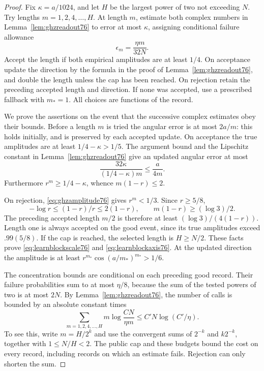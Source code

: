 \begin{proof}
Fix $\kappa=a/1024$, and let $H$ be the largest power of two not
exceeding $N$.  Try lengths $m=1,2,4,\ldots,H$.  At length $m$,
estimate both complex numbers in Lemma~\ref{lem:ghzreadout76} to
error at most $\kappa$, assigning conditional failure allowance
\begin{equation}\label{eq:learnstagebudget76}
 \epsilon_m=\frac{\eta m}{32N}.
\end{equation}
Accept the length if both empirical amplitudes are at least $1/4$.
On acceptance update the direction by the formula in the proof of
Lemma~\ref{lem:ghzreadout76}, and double the length unless the cap
has been reached.  On rejection retain the preceding accepted
length and direction.  If none was accepted, use a prescribed
fallback with $m_*=1$.  All choices are functions of the record.

We prove the assertions on the event that the successive complex
estimates obey their bounds.  Before a length $m$ is tried the
angular error is at most $2a/m$: this holds initially, and is
preserved by each accepted update.  On acceptance the true
amplitudes are at least $1/4-\kappa>1/5$.  The argument bound and
the Lipschitz constant in Lemma~\ref{lem:ghzreadout76} give an
updated angular error at most
\[
 \frac{32\kappa}{(1/4-\kappa)m}\le\frac{a}{4m}.
\]
Furthermore $r^m\ge1/4-\kappa$, whence $m(1-r)\le2$.

On rejection, \eqref{eq:ghzamplitude76} gives $r^m<1/3$.
Since $r\ge5/8$,
\[
 -\log r\le(1-r)/r\le2(1-r),
 \qquad m(1-r)\ge(\log3)/2.
\]
The preceding accepted length $m/2$ is therefore at least
$(\log3)/(4(1-r))$.  Length one is always accepted on the good
event, since its true amplitudes exceed $.99(5/8)$.  If the cap is
reached, the selected length is $H\ge N/2$.  These facts prove
\eqref{eq:learnblockscale76} and \eqref{eq:learnblockaxis76}.
At the updated direction the amplitude is at least
$r^{m_*}\cos(a/m_*)^{m_*}>1/6$.

The concentration bounds are conditional on each preceding good
record.  Their failure probabilities sum to at most $\eta/8$,
because the sum of the tested powers of two is at most $2N$.
By Lemma~\ref{lem:ghzreadout76}, the number of calls is bounded by
an absolute constant times
\begin{equation}\label{eq:learndyadiccost76}
 \sum_{m=1,2,4,\ldots,H}
       m\log\frac{CN}{\eta m}
       \le C'N\log(C'/\eta).
\end{equation}
To see this, write $m=H/2^k$ and use the convergent sums of
$2^{-k}$ and $k2^{-k}$, together with $1\le N/H<2$.
The public cap and these budgets bound the cost on every record,
including records on which an estimate fails.  Rejection can only
shorten the sum.
\end{proof}

